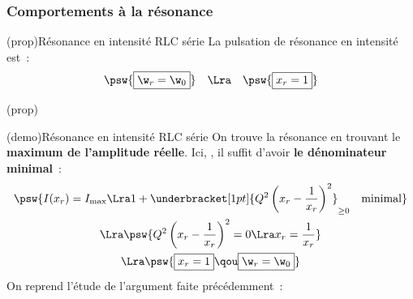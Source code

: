 \documentclass[../../main/main.tex]{subfiles}
\begin{document}
\begin{tcb}[sidebyside, righthand ratio=.4]
\begin{center}
{		}
		\vspace{-15pt}
	\end{center}
\end{tcb}

\subsubsection{Comportements à la résonance}

\begin{tcb*}(prop){Résonance en intensité RLC série}
	La pulsation de résonance en intensité est~:
	\[
		\psw{%
			\boxed{\w_r = \w_0}
		}%
		\quad \Lra \quad
		\psw{%
			\boxed{x_r = 1}
		}
	\]
	\begin{isd}(prop)
		\psw{%
			\[
				\boxed{I(x_r) = I\ind{max} = \frac{E_0}{R}}
			\]
		}%
		\vspace{-15pt}
		\tcblower
		\psw{%
			\[
				\boxed{\f_i(x_r) = 0}
			\]
		}%
		\vspace{-15pt}
	\end{isd}
\end{tcb*}

\begin{tcb*}[breakable](demo){Résonance en intensité RLC série}
	On trouve la résonance en trouvant le \textbf{maximum de l'amplitude réelle}.
	\smallbreak
	Ici, , il suffit d'avoir
	\textbf{le dénominateur minimal}~:
	\begin{gather*}
		\psw{%
			I(x_r) = I_{\max}
			\Lra
			1 + \underbracket[1pt]{Q^2\left( x_r - \frac{1}{x_r} \right)^2}_{\geq 0}
			\quad \text{minimal}
		}%
		\\\Lra
		\psw{%
			Q^2\left( x_r - \frac{1}{x_r} \right)^2 = 0
			\Lra
			x_r = \frac{1}{x_r}
		}%
		\\\Lra
		\psw{%
			\boxed{x_r = 1}
			\qou
			\boxed{\w_r = \w_0}
		}%
	\end{gather*}
	\vspace{-15pt}
	\tcblower
	On reprend l'étude de l'argument faite précédemment~:
	\psw{%
	\[
		\tan(\f_i(x_r)) = - Q \pa{x_r - \frac{1}{x_r}} = 0
		\Lra
		\boxed{\f_i(x_r) = 0}
		\qcr
		\f_i \in \left] -\frac{\pi}{2}\,; \frac{\pi}{2} \right[
	\]
	}%
	\vspace{-15pt}
\end{tcb*}
\end{document}
